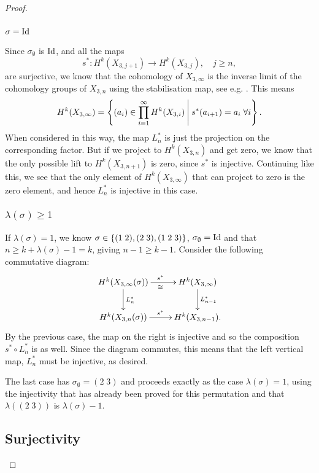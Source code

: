 \begin{proof}
  \subsubsection{$\sigma = \operatorname{Id}$}
  
  Since $\sigma_{\emptyset}$ is $\operatorname{Id}$, and all the maps
  \[ s^* : H^k(X_{3,j+1}) \to H^k(X_{3,j}), \quad j \geq n, \]
  are surjective, we know that the cohomology
  of $X_{3,\infty}$ is the inverse
  limit of the cohomology groups of $X_{3,n}$ using the stabilisation
  map, see e.g. \cite[Chapter 19.4]{may}.
  This means
  \[ H^k(X_{3,\infty}) = \left\{  (a_i)\in \prod_{i=1}^\infty
    H^k(X_{3,i}) \:\Bigg\vert\: s^*(a_{i+1}) = a_i \;\forall i \right\}. \]
  When considered in this way, the map $L_n^*$ is just the projection on
  the corresponding factor. But if we project to $H^k(X_{3,n})$ and
  get zero, we know that
  the only possible lift to $H^k(X_{3,n+1})$ is zero, since $s^*$ is
  injective. Continuing like this, we see that the only element of
  $H^k(X_{3,\infty})$ that can project to zero is the zero element, and
  hence $L_n^*$ is injective in this case.
  
  \subsubsection{$\lambda(\sigma) \geq 1$}
  
  If $\lambda(\sigma)=1$, we know $\sigma \in
  \left\{ (1\;2),(2\;3),(1\;2\;3) \right\}$,
  $\sigma_{\emptyset} = \operatorname{Id}$ and that $n \geq k + \lambda(\sigma) - 1 =
  k$, giving $n-1\geq k-1$. Consider the following commutative diagram:
  \[ \xymatrix{ H^k(X_{3,\infty}(\sigma)) \ar[r]^{s^*}_{\cong}
    \ar[d]^{L_n^*} & 
    H^k(X_{3,\infty}) \ar[d]^{L_{n-1}^*} \\
    H^k(X_{3,n}(\sigma)) \ar[r]^{s^*} & H^k(X_{3,n-1}).
  } \]
  By the previous case, the map on the right is injective and so the
  composition $s^* \circ L_{n}^*$ is as well. Since the diagram
  commutes, this means that the left vertical map, $L_n^*$ must be
  injective, as desired.
  
  The last case has $\sigma_{\emptyset} = (2\;3)$ and proceeds exactly
  as the case $\lambda(\sigma) = 1$, using the injectivity that has
  already been proved for this permutation and that $\lambda((2\;3))$ is
  $\lambda(\sigma)-1$.
  
  \subsection{Surjectivity}
  

\end{proof}
